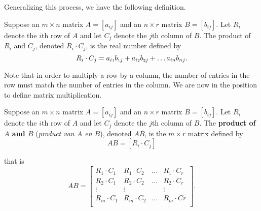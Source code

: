 Generalizing this process, we have the following definition.

\smallskip

\begin{definition} \label{rowcolumnproduct}   
Suppose an $m\times n$ matrix $A = [a_{ij}]$ and an $n\times r$ matrix $B = [b_{ij}]$.  Let $R_i$ denote the $i$th row of $A$ and let $C_j$ denote the $j$th column of $B$.  The  product of $R_{i}$ and $C_{j}$, denoted $R_{i} \cdot C_{j}$, is the real number defined by
\[ R_i \cdot C_j = a_{i\mbox{\tiny$1$}}b_{\mbox{\tiny$1$}j} + a_{i\mbox{\tiny$2$}}b_{\mbox{\tiny$2$}j} + \ldots a_{in}b_{nj}.\]
		
\end{definition}
	


\smallskip

Note that in order to multiply a row by a column, the number of entries in the row must match the number of entries in the column.  We are now in the position to define matrix multiplication.  

\smallskip


	
\begin{definition} \label{matrixproduct}  
Suppose an $m\times n$ matrix $A = [a_{ij}]$ and an $n\times r$ matrix $B = [b_{ij}]$.   Let $R_i$ denote the $i$th row of $A$ and let $C_j$ denote the $j$th column of $B$.  The  \textbf{product of \boldmath $A$ and \boldmath $B$} (\textit{product van $A$ en $B$}), denoted $AB$, is the $m \times r$ matrix defined by
\[AB = \left[ R_i \cdot C_j \right] \]
		
that is
\[
AB = \left[
		\begin{array}{cccc} 
		R_1 \cdot C_1 & R_1 \cdot C_2 & \ldots & R_1 \cdot C_r \\  
		R_2 \cdot C_1 & R_2 \cdot C_2 & \ldots & R_2 \cdot C_r \\
		\vdots  & \vdots & & \vdots \\
		R_m \cdot C_1 & R_m \cdot C_2 & \ldots & R_m \cdot Cr \\  \end{array} \right] .
\]
		
\end{definition}

\smallskip

